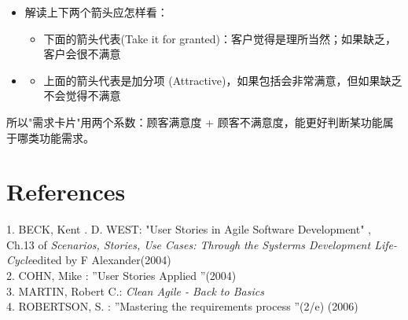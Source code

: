 \begin{itemize}
\tightlist
\item
  解读上下两个箭头应怎样看：\\

  \begin{itemize}
  \tightlist
  \item
    下面的箭头代表(Take it for granted)：客户觉得是理所当然；如果缺乏，客户会很不满意  
  \end{itemize}
\end{itemize}

\begin{description}
\item[]
\end{description}

\begin{itemize}
\item
  \begin{itemize}
  \tightlist
  \item
    上面的箭头代表是加分项 (Attractive)，如果包括会非常满意，但如果缺乏不会觉得不满意 
  \end{itemize}
\end{itemize}

\begin{description}
\item[]
\end{description}

所以"需求卡片"用两个系数：顾客满意度 +
顾客不满意度，能更好判断某功能属于哪类功能需求。

\hypertarget{references}{%
\section{References}\label{references}}

1. BECK, Kent . D. WEST: "User Stories in Agile Software Development" ,
Ch.13 of \emph{Scenarios, Stories, Use Cases: Through the Systerms
Development Life-Cycle}edited by F Alexander(2004)\\
2. COHN, Mike : ''User Stories Applied ''(2004)\\
3. MARTIN, Robert C.: \emph{Clean Agile - Back to Basics}\\
4. ROBERTSON, S. : ''Mastering the requirements process ''(2/e) (2006)\\



